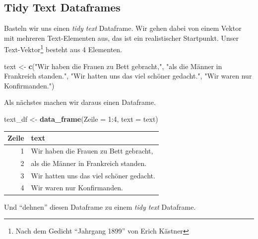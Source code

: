 \documentclass[12pt,ngerman,]{book}
\makeatletter
\newenvironment{Shaded}{\begin{snugshade}}{\end{snugshade}}
\newcommand{\KeywordTok}[1]{\textcolor[rgb]{0.13,0.29,0.53}{\textbf{{#1}}}}
\newcommand{\DataTypeTok}[1]{\textcolor[rgb]{0.13,0.29,0.53}{{#1}}}
\newcommand{\DecValTok}[1]{\textcolor[rgb]{0.00,0.00,0.81}{{#1}}}
\newcommand{\StringTok}[1]{\textcolor[rgb]{0.31,0.60,0.02}{{#1}}}
\newcommand{\CommentTok}[1]{\textcolor[rgb]{0.56,0.35,0.01}{\textit{{#1}}}}
\newcommand{\NormalTok}[1]{{#1}}
\let\rmarkdownfootnote\footnote%
\def\footnote{\protect\rmarkdownfootnote}
\newenvironment{kframe}{%
\medskip{}
\setlength{\fboxsep}{.8em}
 \def\at@end@of@kframe{}%
 \ifinner\ifhmode%
  \def\at@end@of@kframe{\end{minipage}}%
  \begin{minipage}{\columnwidth}%
 \fi\fi%
 \def\FrameCommand##1{\hskip\@totalleftmargin \hskip-\fboxsep
 \colorbox{shadecolor}{##1}\hskip-\fboxsep
     \hskip-\linewidth \hskip-\@totalleftmargin \hskip\columnwidth}%
 \MakeFramed {\advance\hsize-\width
   \@totalleftmargin\z@ \linewidth\hsize
   \@setminipage}}%
 {\par\unskip\endMakeFramed%
 \at@end@of@kframe}
\renewenvironment{Shaded}{\begin{kframe}}{\end{kframe}}
\makeatother
\begin{document}
\subsection{Tidy Text Dataframes}\label{tidy-text-dataframes}

Basteln wir uns einen \emph{tidy text} Dataframe. Wir gehen dabei von
einem Vektor mit mehreren Text-Elementen aus, das ist ein realistischer
Startpunkt. Unser Text-Vektor\footnote{Nach dem Gedicht ``Jahrgang
  1899'' von Erich Kästner} besteht aus 4 Elementen.

\begin{Shaded}
\begin{Highlighting}[]
\NormalTok{text <-}\StringTok{ }\KeywordTok{c}\NormalTok{(}\StringTok{"Wir haben die Frauen zu Bett gebracht,"}\NormalTok{,}
          \StringTok{"als die Männer in Frankreich standen."}\NormalTok{,}
          \StringTok{"Wir hatten uns das viel schöner gedacht."}\NormalTok{,}
          \StringTok{"Wir waren nur Konfirmanden."}\NormalTok{)}
\end{Highlighting}
\end{Shaded}

Als nächstes machen wir daraus einen Dataframe.

\begin{Shaded}
\begin{Highlighting}[]
\NormalTok{text_df <-}\StringTok{ }\KeywordTok{data_frame}\NormalTok{(}\DataTypeTok{Zeile =} \DecValTok{1}\NormalTok{:}\DecValTok{4}\NormalTok{,}
                      \DataTypeTok{text =} \NormalTok{text)}
\end{Highlighting}
\end{Shaded}

\begin{tabular}{r|l}
\hline
Zeile & text\\
\hline
1 & Wir haben die Frauen zu Bett gebracht,\\
\hline
2 & als die Männer in Frankreich standen.\\
\hline
3 & Wir hatten uns das viel schöner gedacht.\\
\hline
4 & Wir waren nur Konfirmanden.\\
\hline
\end{tabular}

Und ``dehnen'' diesen Dataframe zu einem \emph{tidy text} Dataframe.

\begin{Shaded}
\end{Shaded}
\end{document}
